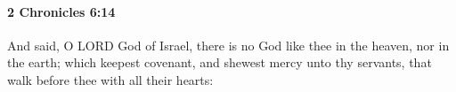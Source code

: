 
		\paragraph{2 Chronicles 6:14} %
			\label{2CHRONICLES-6-14}

			And said, O LORD God of Israel, there is no God like thee in the heaven, nor in the earth; which keepest covenant, and shewest mercy unto thy servants, that walk before thee with all their hearts:



